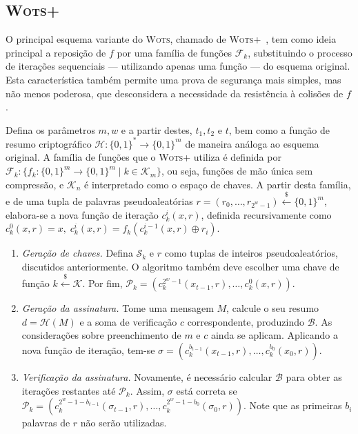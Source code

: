 \documentclass[12pt]{report}
\newcommand{\pk}{$\mathcal{P}_k$}
\newcommand{\sk}{$\mathcal{S}_k$}
\newcommand{\binwds}[1]{\{0, 1\}^{#1}}
\begin{document}
\subsection{\textsc{Wots+}}

O principal esquema variante do \textsc{Wots}, chamado de \textsc{Wots+}~\cite{cryptoeprint:2017:965}, tem como ideia principal a reposição de $f$ por uma família de funções $\mathcal{F}_k$, substituindo o processo de iterações sequenciais --- utilizando apenas uma função --- do esquema original. Esta característica também permite uma prova de segurança mais simples, mas não menos poderosa, que desconsidera a necessidade da resistência à colisões de $f$.

Defina os parâmetros $m, w$ e a partir destes, $t_1, t_2 \text{ e } t$, bem como a função de resumo criptográfico $\mathcal{H} : \binwds{*} \longrightarrow \binwds{m}$ de maneira análoga ao esquema original. A família de funções que o \textsc{Wots+} utiliza é definida por $\mathcal{F}_k : \{f_k : \binwds{m} \longrightarrow \binwds{m} \mid k \in \mathcal{K}_m\}$, ou seja, funções de mão única sem compressão, e $\mathcal{K}_n$ é interpretado como o espaço de chaves. A partir desta família, e de uma tupla de palavras pseudoaleatórias $r = (r_0, \dots, r_{2^w - 1}) \stackrel{\$}{\longleftarrow} \binwds{m}$, elabora-se a nova função de iteração $c^{i}_{k}(x, r)$, definida recursivamente como $c^{0}_{k}(x, r) = x, \; c^{i}_{k}(x, r) = f_k(c^{i-1}_{k}(x, r) \oplus r_i)$.

\begin{enumerate}

    \item[] \emph{Geração de chaves.} Defina \sk{} e $r$ como tuplas de inteiros pseudoaleatórios, discutidos anteriormente. O algoritmo também deve escolher uma chave de função $k \stackrel{\$}\longleftarrow \mathcal{K}$. Por fim, $\text{\pk{}} = (c^{2^w-1}_{k}(x_{t-1}, r), \dots, c^{0}_{k}(x, r))$.
    
    \item[] \emph{Geração da assinatura.} Tome uma mensagem $M$, calcule o seu resumo $d = \mathcal{H}(M)$ e a soma de verificação $c$ correspondente, produzindo $\mathcal{B}$. As considerações sobre preenchimento de $m$ e $c$ ainda se aplicam. Aplicando a nova função de iteração, tem-se $\sigma = (c^{b_{t - 1}}_{k}(x_{t-1}, r), \dots, c^{b_{0}}_{k}(x_{0}, r))$.
    
    \item[] \emph{Verificação da assinatura.} Novamente, é necessário calcular $\mathcal{B}$ para obter as iterações restantes até \pk{}. Assim, $\sigma$ está correta se $\text{\pk{}} = (c^{2^{w} - 1 - b_{t - 1}}_{k}(\sigma_{t-1}, r), \dots, c^{2^{w} - 1 - b_{0}}_{k}(\sigma_{0}, r))$. Note que as primeiras $b_i$ palavras de $r$ não serão utilizadas.

\end{enumerate}
\end{document}
